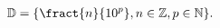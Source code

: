 \documentclass[preview]{standalone}
\begin{document}
\begin{align*}
\mathbb{D} = \{\fract{n}{10^p},n \in \mathbb{Z},p \in \mathbb{N}\}.
\end{align*}
\end{document}
